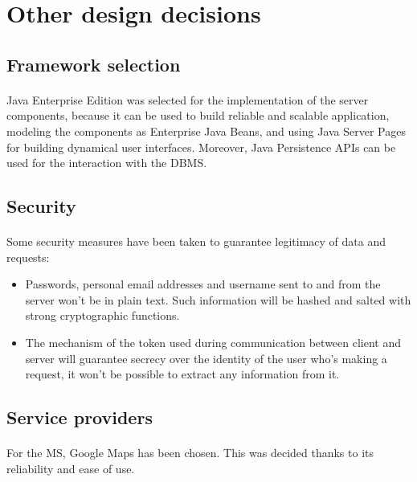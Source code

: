 \begin{description}
					\end{description}

		\section{Other design decisions}
			\subsection{Framework selection}
				\paragraph{}
					Java Enterprise Edition was selected for the implementation of the server components, because it can be used to build reliable and scalable application, modeling the components as Enterprise Java Beans, and using Java Server Pages for building dynamical user interfaces. Moreover, Java Persistence APIs can be used for the interaction with the DBMS.
			\subsection{Security}
				\paragraph{}
					Some security measures have been taken to guarantee legitimacy of data and requests:
						\begin{itemize}
							\item Passwords, personal email addresses and username sent to and from the server won't be in plain text. Such information will be hashed and salted with strong cryptographic functions.
							\item The mechanism of the token used during communication between client and server will guarantee secrecy over the identity of the user who's making a request, it won't be possible to extract any information from it. 
						\end{itemize}
			\subsection{Service providers}
				\paragraph{}
					For the MS, Google Maps has been chosen. This was decided thanks to its reliability and ease of use.